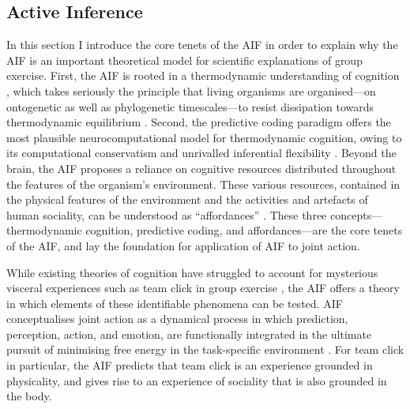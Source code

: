 \begin{CJK}{UTF8}{gbsn}
\section{Active Inference \label{sect:activeIn}}
In this section I introduce the core tenets of the AIF in order to explain why the AIF is an important theoretical model for scientific explanations of group exercise.  First, the AIF is rooted in a thermodynamic understanding of cognition \citep{Yufik2017}, which takes seriously the principle that living organisms are organised---on ontogenetic as well as phylogenetic timescales---to resist dissipation towards thermodynamic equilibrium \citep[i.e., entropy, uncertainty, or chaos; see][]{Friston2010,Yufik2002,Sengupta2016,Linson2018}. Second, the predictive coding paradigm \citep[cf.][]{Rao1999,Clark2013} offers the most plausible neurocomputational model for thermodynamic cognition, owing to its computational conservatism and unrivalled inferential flexibility \citep{Friston2006}.  Beyond the brain, the AIF proposes a reliance on cognitive resources distributed throughout the features of the organism’s environment. These various resources, contained in the physical features of the environment and the activities and artefacts of human sociality, can be understood as ``affordances'' \citep{Gibson1979,Ramstead2016,Bruineberg2014}. These three concepts---thermodynamic cognition, predictive coding, and affordances---are the core tenets of the AIF, and lay the foundation for application of AIF to joint action.

While existing theories of cognition have struggled to account for mysterious visceral experiences such as team click in group exercise \citep{Dietrich2004,Slingerland2014}, the AIF offers a theory in which elements of these identifiable phenomena can be tested.  AIF conceptualises joint action as a dynamical process in which prediction, perception, action, and emotion, are functionally integrated in the ultimate pursuit of minimising free energy in the task-specific environment \citep{Clark2015}.  For team click in particular, the AIF predicts that team click is an experience grounded in physicality, and gives rise to an experience of sociality that is also grounded in the body.



\end{CJK}
